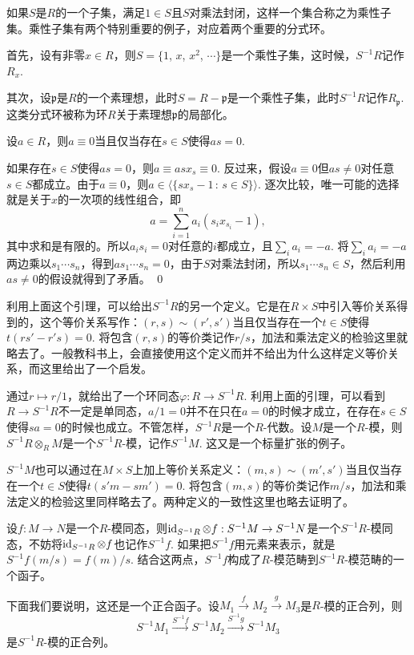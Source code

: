 如果$S$是$R$的一个子集，满足$1\in S$且$S$对乘法封闭，这样一个集合称之为乘性子集。乘性子集有两个特别重要的例子，对应着两个重要的分式环。

首先，设有非零$x\in R$，则$S=\{1$, $x$, $x^2$, $\cdots\}$是一个乘性子集，这时候，$S^{-1}R$记作$R_x$.

其次，设$\mathfrak{p}$是$R$的一个素理想，此时$S=R-\mathfrak{p}$是一个乘性子集，此时$S^{-1}R$记作$R_\mathfrak{p}$. 这类分式环被称为环$R$关于素理想$\mathfrak{p}$的局部化。

\lem 设$a\in R$，则$a\equiv 0$当且仅当存在$s \in S$使得$as=0$.

\proof 
	如果存在$s \in S$使得$as=0$，则$a\equiv asx_s\equiv 0$. 反过来，假设$a\equiv 0$但$as\neq 0$对任意$s\in S$都成立。由于$a\equiv 0$，则$a\in \bigl\langle\{sx_s-1\,:\, s\in S\}\bigr\rangle$. 逐次比较，唯一可能的选择就是关于$x$的一次项的线性组合，即
	\[
	a=\sum_{i=1}^n a_i(s_ix_{s_i}-1),
	\]
	其中求和是有限的。所以$a_is_i=0$对任意的$i$都成立，且$\sum_i a_i=-a$. 将$\sum_i a_i=-a$两边乘以$s_1\cdots s_n$，得到$as_1\cdots s_n=0$，由于$S$对乘法封闭，所以$s_1\cdots s_n\in S$，然后利用$as\neq 0$的假设就得到了矛盾。
\qed

\para 利用上面这个引理，可以给出$S^{-1}R$的另一个定义。它是在$R\times S$中引入等价关系得到的，这个等价关系写作：$(r,s)\sim (r',s')$当且仅当存在一个$t\in S$使得$t(rs'-r's)=0$. 将包含$(r,s)$的等价类记作$r/s$，加法和乘法定义的检验这里就略去了。一般教科书上，会直接使用这个定义而并不给出为什么这样定义等价关系，而这里给出了一个启发。

通过$r\mapsto r/1$，就给出了一个环同态$\varphi:R\to S^{-1}R$. 利用上面的引理，可以看到$R\to S^{-1}R$不一定是单同态，$a/1=0$并不在只在$a=0$的时候才成立，在存在$s\in S$使得$sa=0$的时候也成立。不管怎样，$S^{-1}R$是一个$R$-代数。设$M$是一个$R$-模，则$S^{-1}R\otimes_R M$是一个$S^{-1}R$-模，记作$S^{-1}M$. 这又是一个标量扩张的例子。

$S^{-1}M$也可以通过在$M\times S$上加上等价关系定义：$(m,s)\sim (m',s')$当且仅当存在一个$t\in S$使得$t(s'm-sm')=0$. 将包含$(m,s)$的等价类记作$m/s$，加法和乘法定义的检验这里同样略去了。两种定义的一致性这里也略去证明了。

\para 设$f:M\to N$是一个$R$-模同态，则$\operatorname{id}_{S^{-1}R}\otimes f:S^{-1}M\to S^{-1}N$是一个$S^{-1}R$-模同态，不妨将$\operatorname{id}_{S^{-1}R}\otimes f$也记作$S^{-1}f$. 如果把$S^{-1}f$用元素来表示，就是$S^{-1}f(m/s)=f(m)/s$. 结合这两点，$S^{-1}f$构成了$R$-模范畴到$S^{-1}R$-模范畴的一个函子。

下面我们要说明，这还是一个正合函子。设$M_1\xrightarrow{f} M_2\xrightarrow{g} M_3$是$R$-模的正合列，则
\[
	S^{-1}M_1\xrightarrow{S^{-1}f} S^{-1}M_2\xrightarrow{S^{-1}g} S^{-1}M_3
\]
是$S^{-1}R$-模的正合列。

